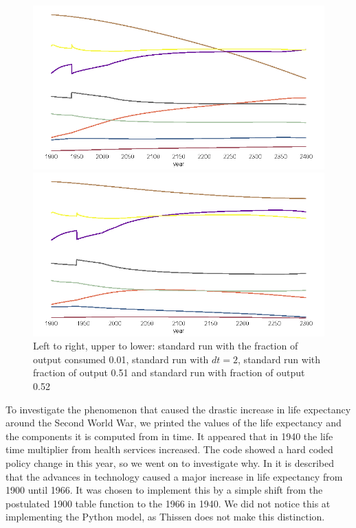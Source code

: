\documentclass[10pt,a4paper]{scrartcl}
\begin{document}
\begin{figure}
\begin{minipage}{0.49\textwidth}
\end{minipage}
\begin{minipage}{0.49\textwidth}
\includegraphics[width=\textwidth]{./plaatjes/output-consumed-0,51.png}
\end{minipage}
\begin{minipage}{0.49\textwidth}
\includegraphics[width=\textwidth]{./plaatjes/output-consumed-0,52.png}
\end{minipage}
\caption{Left to right, upper to lower: standard run with the fraction of output consumed 0.01, standard run with $dt=2$, standard run with fraction of output 0.51 and standard run with fraction of output 0.52}
\label{composition}
\end{figure}

To investigate the phenomenon that caused the drastic increase in life expectancy around the Second World War, we printed the values of the life expectancy and the components it is computed from in time. It appeared that in 1940 the life time multiplier from health services increased. The code showed a hard coded policy change in this year, so we went on to investigate why. In \cite{meadows1974dynamics} it is described that the advances in technology caused a major increase in life expectancy from 1900 until 1966. It was chosen to implement this by a simple shift from the postulated 1900 table function to the 1966 in 1940. We did not notice this at implementing the Python model, as Thissen does not make this distinction. 
\end{document}
